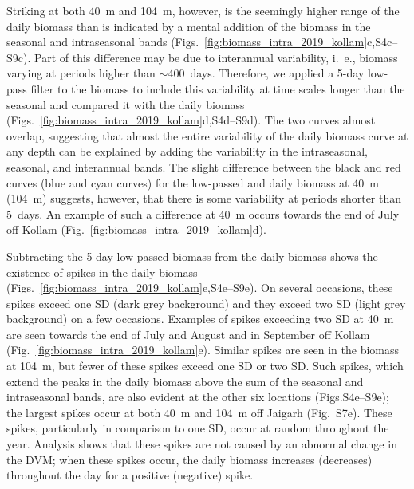 \documentclass[authoryear,review,11pt]{elsarticle}
\begin{document}
Striking at both 40~m and 104~m, however, is the seemingly higher range of the daily biomass than is indicated by a mental addition of the biomass in the seasonal and intraseasonal bands (Figs.~\ref{fig:biomass_intra_2019_kollam}c,S4c--S9c). Part of this difference may be due to interannual variability, i.~e., biomass varying at periods higher than $\sim$400~days.  Therefore, we applied a 5-day low-pass filter to the biomass to include this variability at time scales longer than the seasonal and compared it with the daily biomass (Figs.~\ref{fig:biomass_intra_2019_kollam}d,S4d--S9d).  The two curves almost overlap, suggesting that almost the entire variability of the daily biomass curve at any depth can be explained by adding the variability in the intraseasonal, seasonal, and interannual bands. The slight difference between the black and red curves (blue and cyan curves) for the low-passed and daily biomass at 40~m (104~m) suggests, however, that there is some variability at periods shorter than 5~days.  An example of such a difference at 40~m occurs towards the end of July off Kollam (Fig.~\ref{fig:biomass_intra_2019_kollam}d).

Subtracting the 5-day low-passed biomass from the daily biomass shows the existence of spikes in the daily biomass (Figs.~\ref{fig:biomass_intra_2019_kollam}e,S4e--S9e).  On several occasions, these spikes exceed one SD (dark grey background) and they exceed two SD (light grey background) on a few occasions.  Examples of spikes exceeding two SD at 40~m are seen towards the end of July and August and in September off Kollam (Fig.~\ref{fig:biomass_intra_2019_kollam}e). Similar spikes are seen in the biomass at 104~m, but fewer of these spikes exceed one SD or two SD. Such spikes, which extend the peaks in the daily biomass above the sum of the seasonal and intraseasonal bands, are also evident at the other six locations (Figs.S4e--S9e); the largest spikes occur at both 40~m and 104~m off Jaigarh (Fig.~S7e). These spikes, particularly in comparison to one SD, occur at random throughout the year.  Analysis shows that these spikes are not caused by an abnormal change in the DVM; when these spikes occur, the daily biomass increases (decreases) throughout the day for a positive (negative) spike.
\end{document}
